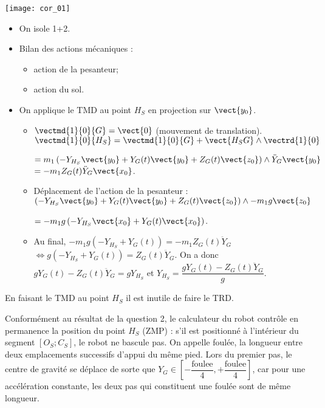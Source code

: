 \begin{multicols}{2}
\begin{corrige}
\begin{center}
\texttt{[image: cor\_01]}
\end{center}

\begin{itemize}
\item On isole 1+2.
\item Bilan des actions mécaniques :
\begin{itemize}
\item action de la pesanteur;
\item action du sol.
\end{itemize}
\item On applique le TMD au point $H_S$ en projection sur $\vect{y_0}$. 
\begin{itemize}
\item $\vectmd{1}{0}{G}=\vect{0}$ (mouvement de translation). $\vectmd{1}{0}{H_S}=\vectmd{1}{0}{G}+\vect{H_S G}\wedge \vectrd{1}{0}$ 

$=m_1\left(-Y_{H_S}\vect{y_0}+Y_G(t)\vect{y_0}+Z_G(t)\vect{z_0}\right) \wedge \ddot{Y}_G\vect{y_0}$
$=-m_1Z_G(t) \ddot{Y}_G\vect{x_0}$.

\item Déplacement de l'action de la pesanteur : $\left(-Y_{H_S}\vect{y_0}+Y_G(t)\vect{y_0}+Z_G(t)\vect{z_0}\right) \wedge - m_1 g \vect{z_0} $

  $= - m_1 g \left(-Y_{H_S}\vect{x_0}+Y_G(t)\vect{x_0}\right) $.
  \item Au final, $- m_1 g \left(-Y_{H_S}+Y_G(t)\right) = -m_1Z_G(t) \ddot{Y}_G$ 
  $\Leftrightarrow   g \left(-Y_{H_S}+Y_G(t)\right) = Z_G(t) \ddot{Y}_G$. On a donc $gY_G(t)- Z_G(t) \ddot{Y}_G=gY_{H_S}$ et $Y_{H_S} = \dfrac{gY_G(t)- Z_G(t) \ddot{Y}_G}{g}$.
\end{itemize}
\end{itemize}

En faisant le TMD au point $H_S$ il est inutile de faire le TRD. 
\end{corrige}
\else
\fi


\ifprof
\else

Conformément au résultat de la question 2, le calculateur du robot contrôle en permanence la position du
point $H_S$ (ZMP) : s'il est positionné à l'intérieur du segment $[O_S ;C_S ]$, le robot ne bascule pas.
On appelle foulée, la longueur entre deux emplacements successifs d'appui du même pied. Lors du premier
pas, le centre de gravité se déplace de sorte que $Y_G \in \left[ -\dfrac{\text{foulee}}{4},+\dfrac{\text{foulee}}{4}\right]$, car pour une accélération constante, les deux pas qui constituent une foulée sont de même longueur.


\end{multicols}
